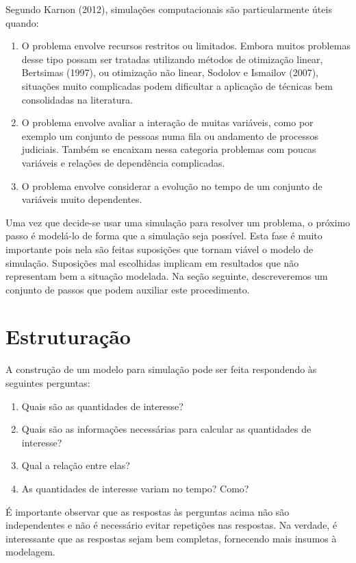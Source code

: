 \documentclass[]{book}
\providecommand{\tightlist}{%
  \setlength{\itemsep}{0pt}\setlength{\parskip}{0pt}}
\begin{document}
Segundo Karnon (2012), simulações computacionais são particularmente
úteis quando:

\begin{enumerate}
\def\labelenumi{\arabic{enumi}.}
\item
  O problema envolve recursos restritos ou limitados. Embora muitos
  problemas desse tipo possam ser tratadas utilizando métodos de
  otimização linear, Bertsimas (1997), ou otimização não linear, Sodolov
  e Ismailov (2007), situações muito complicadas podem dificultar a
  aplicação de técnicas bem consolidadas na literatura.
\item
  O problema envolve avaliar a interação de muitas variáveis, como por
  exemplo um conjunto de pessoas numa fila ou andamento de processos
  judiciais. Também se encaixam nessa categoria problemas com poucas
  variáveis e relações de dependência complicadas.
\item
  O problema envolve considerar a evolução no tempo de um conjunto de
  variáveis muito dependentes.
\end{enumerate}

Uma vez que decide-se usar uma simulação para resolver um problema, o
próximo passo é modelá-lo de forma que a simulação seja possível. Esta
fase é muito importante pois nela são feitas suposições que tornam
viável o modelo de simulação. Suposições mal escolhidas implicam em
resultados que não representam bem a situação modelada. Na seção
seguinte, descreveremos um conjunto de passos que podem auxiliar este
procedimento.

\section{Estruturação}\label{estruturacao}

A construção de um modelo para simulação pode ser feita respondendo às
seguintes perguntas:

\begin{enumerate}
\def\labelenumi{\arabic{enumi}.}
\tightlist
\item
  Quais são as quantidades de interesse?
\item
  Quais são as informações necessárias para calcular as quantidades de
  interesse?
\item
  Qual a relação entre elas?
\item
  As quantidades de interesse variam no tempo? Como?
\end{enumerate}

É importante observar que as respostas às perguntas acima não são
independentes e não é necessário evitar repetições nas respostas. Na
verdade, é interessante que as respostas sejam bem completas, fornecendo
mais insumos à modelagem.
\end{document}
